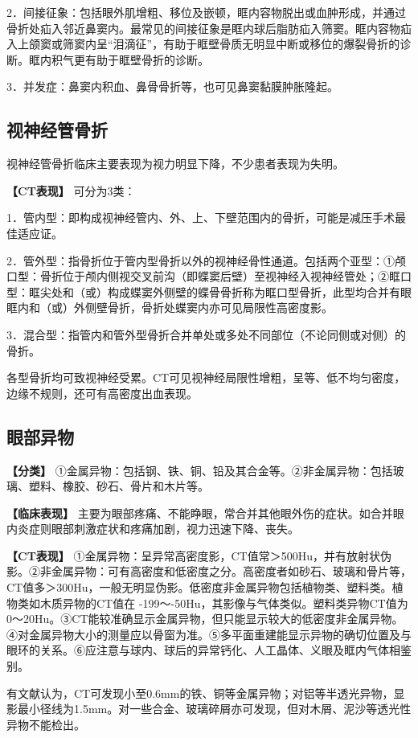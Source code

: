 2．间接征象：包括眼外肌增粗、移位及嵌顿，眶内容物脱出或血肿形成，并通过骨折处疝入邻近鼻窦内。最常见的间接征象是眶内球后脂肪疝入筛窦。眶内容物疝入上颌窦或筛窦内呈“泪滴征”，有助于眶壁骨质无明显中断或移位的爆裂骨折的诊断。眶内积气更有助于眶壁骨折的诊断。

3．并发症：鼻窦内积血、鼻骨骨折等，也可见鼻窦黏膜肿胀隆起。

\subsection{视神经管骨折}

视神经管骨折临床主要表现为视力明显下降，不少患者表现为失明。

\textbf{【CT表现】} 可分为3类：

1．管内型：即构成视神经管内、外、上、下壁范围内的骨折，可能是减压手术最佳适应证。

2．管外型：指骨折位于管内型骨折以外的视神经骨性通道。包括两个亚型：①颅口型：骨折位于颅内侧视交叉前沟（即蝶窦后壁）至视神经入视神经管处；②眶口型：眶尖处和（或）构成蝶窦外侧壁的蝶骨骨折称为眶口型骨折，此型均合并有眼眶内和（或）外侧壁骨折，骨折处蝶窦内亦可见局限性高密度影。

3．混合型：指管内和管外型骨折合并单处或多处不同部位（不论同侧或对侧）的骨折。

各型骨折均可致视神经受累。CT可见视神经局限性增粗，呈等、低不均匀密度，边缘不规则，还可有高密度出血表现。

\subsection{眼部异物}

\textbf{【分类】}
①金属异物：包括钢、铁、铜、铅及其合金等。②非金属异物：包括玻璃、塑料、橡胶、砂石、骨片和木片等。

\textbf{【临床表现】}
主要为眼部疼痛、不能睁眼，常合并其他眼外伤的症状。如合并眼内炎症则眼部刺激症状和疼痛加剧，视力迅速下降、丧失。

\textbf{【CT表现】}
①金属异物：呈异常高密度影，CT值常＞500Hu，并有放射状伪影。②非金属异物：可有高密度和低密度之分。高密度者如砂石、玻璃和骨片等，CT值多＞300Hu，一般无明显伪影。低密度非金属异物包括植物类、塑料类。植物类如木质异物的CT值在
-199～-50Hu，其影像与气体类似。塑料类异物CT值为0～20Hu。③CT能较准确显示金属异物，但只能显示较大的低密度非金属异物。④对金属异物大小的测量应以骨窗为准。⑤多平面重建能显示异物的确切位置及与眼环的关系。⑥应注意与球内、球后的异常钙化、人工晶体、义眼及眶内气体相鉴别。

有文献认为，CT可发现小至0.6mm的铁、铜等金属异物；对铝等半透光异物，显影最小径线为1.5mm。对一些合金、玻璃碎屑亦可发现，但对木屑、泥沙等透光性异物不能检出。

